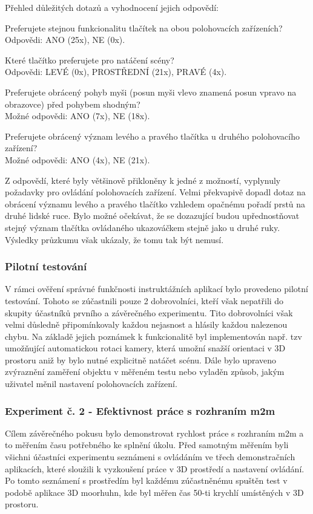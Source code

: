 \noindent Přehled důležitých dotazů a vyhodnocení jejich odpovědí:

\noindent Preferujete stejnou funkcionalitu tlačítek na obou polohovacích zařízeních?\\
Odpovědi: ANO (25x), NE (0x).

\noindent Které tlačítko preferujete pro natáčení scény?\\
Odpovědi: LEVÉ (0x), PROSTŘEDNÍ (21x), PRAVÉ (4x).

\noindent Preferujete obrácený pohyb myši (posun myši vlevo znamená posun vpravo na obrazovce) před pohybem shodným?\\
Možné odpovědi: ANO (7x), NE (18x).

\noindent Preferujete obrácený význam levého a pravého tlačítka u druhého polohovacího zařízení?\\
Možné odpovědi: ANO (4x), NE (21x).

Z odpovědí, které byly většinově přikloněny k jedné z možností, vyplynuly požadavky pro ovládání polohovacích zařízení. Velmi překvapivě dopadl dotaz na obrácení významu levého a pravého tlačítko vzhledem opačnému pořadí prstů na druhé lidské ruce. Bylo možné očekávat, že se dozazující budou upřednostňovat stejný význam tlačítka ovládaného ukazováčkem stejně jako u druhé ruky. Výsledky průzkumu však ukázaly, že tomu tak být nemusí. 

\subsubsection{Pilotní testování}
V rámci ověření správné funkčnosti instruktážních aplikací bylo provedeno pilotní testování. Tohoto se zúčastnili pouze 2 dobrovolníci, kteří však nepatřili do skupity účastníků prvního a závěrečného experimentu. Tito dobrovolníci však velmi důsledně připomínkovaly každou nejasnost a hlásily každou nalezenou chybu. Na základě jejich poznámek k funkcionalitě byl implementován např. tzv  umožňující automatickou rotaci kamery, která umožní snažší orientaci v 3D prostoru aniž by bylo nutné explicitně natáčet scénu. Dále bylo upraveno zvýraznění zaměření objektu v měřeném testu nebo vyladěn způsob, jakým uživatel měnil nastavení polohovacích zařízení.

\subsubsection{Experiment č. 2 - Efektivnost práce s rozhraním m2m}
Cílem závěrečného pokusu bylo demonstrovat rychlost práce s rozhraním m2m a to měřením času potřebného ke splnění úkolu. Před samotným měřením byli všichni účastníci experimentu seznámeni s ovládáním ve třech demonstračních aplikacích, které sloužili k vyzkoušení práce v 3D prostředí a nastavení ovládání. Po tomto seznámení s prostředím byl každému zúčastněnému spuštěn test v podobě aplikace 3D moorhuhn, kde byl měřen čas  50-ti krychlí umístěných v 3D prostoru.


